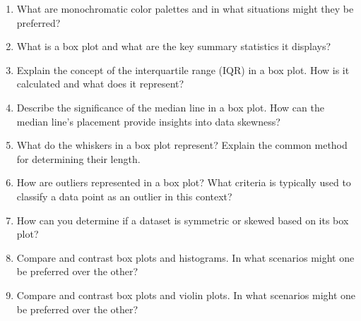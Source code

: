 \begin{enumerate}[nosep]
    \item What are monochromatic color palettes and in what situations might they be preferred?
    \item What is a box plot and what are the key summary statistics it displays?
    \item Explain the concept of the interquartile range (IQR) in a box plot. How is it calculated and what does it represent?
    \item Describe the significance of the median line in a box plot. How can the median line's placement provide insights into data skewness?
    \item What do the whiskers in a box plot represent? Explain the common method for determining their length.
    \item How are outliers represented in a box plot? What criteria is typically used to classify a data point as an outlier in this context?
    \item How can you determine if a dataset is symmetric or skewed based on its box plot?
    \item Compare and contrast box plots and histograms. In what scenarios might one be preferred over the other?
    \item Compare and contrast box plots and violin plots. In what scenarios might one be preferred over the other?
\end{enumerate}
